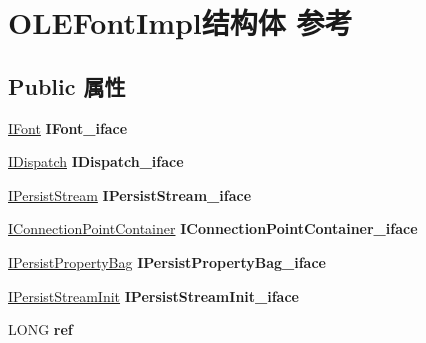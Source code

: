 \hypertarget{struct_o_l_e_font_impl}{}\section{O\+L\+E\+Font\+Impl结构体 参考}
\label{struct_o_l_e_font_impl}
\subsection*{Public 属性}
\begin{DoxyCompactItemize}
\item 
\mbox{\label{struct_o_l_e_font_impl_aa0826db2e3fa92cd555795c91b52e2ad}} 
\hyperlink{interface_i_font}{I\+Font} {\bfseries I\+Font\+\_\+iface}
\item 
\mbox{\label{struct_o_l_e_font_impl_ac1fbe4b7aeed2e7c0dddf8f30448e037}} 
\hyperlink{interface_i_dispatch}{I\+Dispatch} {\bfseries I\+Dispatch\+\_\+iface}
\item 
\mbox{\label{struct_o_l_e_font_impl_aca23cb678dc995bec96a8ac1e9d087a8}} 
\hyperlink{interface_i_persist_stream}{I\+Persist\+Stream} {\bfseries I\+Persist\+Stream\+\_\+iface}
\item 
\mbox{\label{struct_o_l_e_font_impl_af8074508dbae3ac41ae7de07b69dac6a}} 
\hyperlink{interface_i_connection_point_container}{I\+Connection\+Point\+Container} {\bfseries I\+Connection\+Point\+Container\+\_\+iface}
\item 
\mbox{\label{struct_o_l_e_font_impl_a6a46a24cc6fec24a2f5a0445ecc412fb}} 
\hyperlink{interface_i_persist_property_bag}{I\+Persist\+Property\+Bag} {\bfseries I\+Persist\+Property\+Bag\+\_\+iface}
\item 
\mbox{\label{struct_o_l_e_font_impl_ad59d685f836547c44258dba9bfa4ada7}} 
\hyperlink{interface_i_persist_stream_init}{I\+Persist\+Stream\+Init} {\bfseries I\+Persist\+Stream\+Init\+\_\+iface}
\item 
\mbox{\label{struct_o_l_e_font_impl_a6f86abbbdc3cf4f5da651c29aeef4100}} 
L\+O\+NG {\bfseries ref}
\item 

\end{DoxyCompactItemize}
